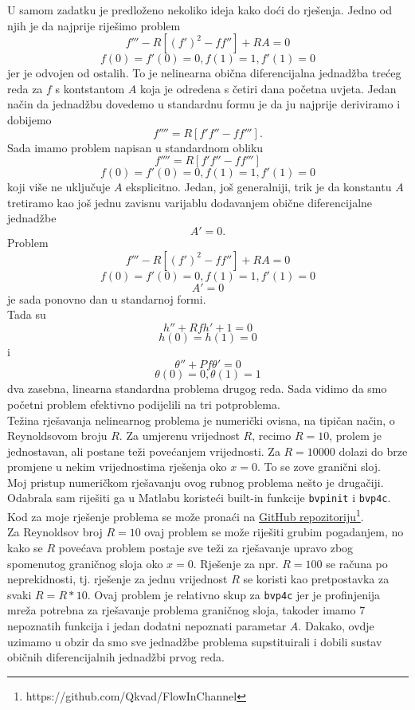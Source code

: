 \documentclass[a4paper]{article}
\newcommand{\code}[1]{\texttt{#1}}
\begin{document}
U samom zadatku je predloženo nekoliko ideja kako doći do rješenja. Jedno od njih je da najprije riješimo problem
\[ f''' - R [(f')^2 - ff''] + RA = 0 \]
\[ f(0)=f'(0)=0, f(1)=1, f'(1)=0 \]
jer je odvojen od ostalih. To je nelinearna obična diferencijalna jednadžba trećeg reda za $f$ s kontstantom $A$ koja je  odredena s četiri dana početna uvjeta. Jedan način da  jednadžbu dovedemo u standardnu formu je da ju najprije deriviramo i dobijemo
\[ f''''=R[f'f'' - ff''']  .\]
Sada imamo problem napisan u standardnom obliku
\[ f''''=R[f'f'' - ff'''] \]
\[ f(0)=f'(0)=0, f(1)=1, f'(1)=0 \]
koji više ne uključuje $A$ eksplicitno. Jedan, još generalniji, trik je da konstantu $A$ tretiramo kao još jednu zavisnu varijablu dodavanjem obične diferencijalne jednadžbe 
\[ A'=0. \]
Problem 
\[ f''' - R [(f')^2 - ff''] + RA = 0 \]
\[ f(0)=f'(0)=0, f(1)=1, f'(1)=0 \]
\[ A'=0 \]
je sada ponovno dan u standarnoj formi. \\
Tada su 
\[ h'' + Rfh' + 1 = 0 \]
\[ h(0)=h(1)=0 \]
i
\[ \theta'' + Pf\theta' = 0 \]
\[ \theta(0)=0, \theta(1)=1 \]
dva zasebna, linearna standardna problema drugog reda. Sada vidimo da smo početni problem efektivno podijelili na tri potproblema. \\

Težina rješavanja nelinearnog problema je numerički ovisna, na tipičan način, o Reynoldsovom broju $R$. Za umjerenu vrijednost $R$, recimo $R=10$, prolem je jednostavan, ali postane teži povećanjem vrijednosti. Za $R=10000$ dolazi do brze promjene u nekim vrijednostima rješenja oko $x=0$. To se zove granični sloj. \\

Moj pristup numeričkom rješavanju ovog rubnog problema nešto je drugačiji. Odabrala sam riješiti ga u Matlabu koristeći built-in funkcije \code{bvpinit} i \code{bvp4c}. Kod za moje rješenje problema se može pronaći na \hyperref[https://github.com/Qkvad/FlowInChannel]{GitHub repozitoriju}\footnote{https://github.com/Qkvad/FlowInChannel}.\\

Za Reynoldsov broj $R=10$ ovaj problem se može riješiti grubim pogadanjem, no kako se $R$ povećava problem postaje sve teži za rješavanje upravo zbog spomenutog graničnog sloja oko $x=0$. Rješenje za npr. $R=100$ se računa po neprekidnosti, tj. rješenje za jednu vrijednost $R$ se koristi kao pretpostavka za svaki $R=R*10$. Ovaj problem je relativno skup za \code{bvp4c} jer je profinjenija mreža potrebna za rješavanje problema graničnog sloja, takoder imamo 7 nepoznatih funkcija i jedan dodatni nepoznati parametar $A$. 
Dakako, ovdje uzimamo u obzir da smo sve jednadžbe problema supstituirali i dobili sustav običnih diferencijalnih jednadžbi prvog reda.\\
 
\end{document}
